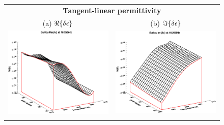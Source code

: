\begin{figure}[htp]
  \centering
  \begin{tabular}{c c}
    \multicolumn{2}{c}{\sffamily\textbf{Tangent-linear permittivity}}\\
    \textsf{(a)} $\Re\{\delta\epsilon\}$ &
    \textsf{(b)} $\Im\{\delta\epsilon\}$ \\
    \includegraphics[bb=130 240 508 540,clip,scale=0.5]{graphics/Guillou/TLAD/e_TL_re_16.25GHz.eps} &
    \includegraphics[bb=125 240 508 540,clip,scale=0.5]{graphics/Guillou/TLAD/e_TL_im_16.25GHz.eps} \\\\

\end{tabular}
\end{figure}
